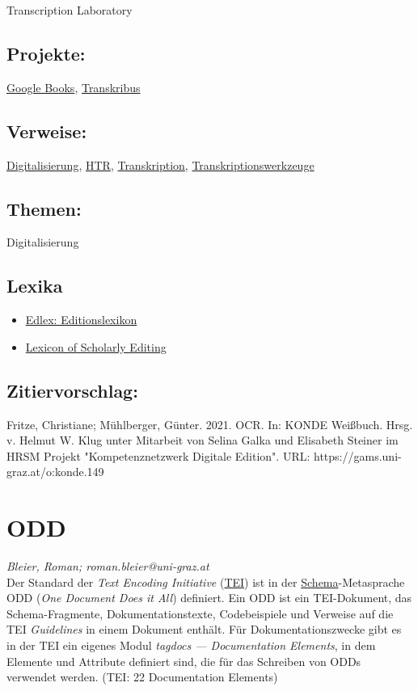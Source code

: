 \documentclass{article}
\begin{document}
{                           Transcription Laboratory}\subsection*{Projekte:}\href{https://books.google.at}{Google Books}, \href{https://readcoop.eu/transkribus/}{Transkribus}\subsection*{Verweise:}\href{https://gams.uni-graz.at/o:konde.60}{Digitalisierung}, \href{https://gams.uni-graz.at/o:konde.224}{HTR}, \href{https://gams.uni-graz.at/o:konde.197}{Transkription}, \href{https://gams.uni-graz.at/o:konde.199}{Transkriptionswerkzeuge}\subsection*{Themen:}Digitalisierung\subsection*{Lexika}\begin{itemize}\item \href{https://edlex.de/index.php?title=Optical_Character_Recognition_(OCR)}{Edlex: Editionslexikon}\item \href{https://lexiconse.uantwerpen.be/index.php/lexicon/ocr/}{Lexicon of Scholarly Editing}\end{itemize}\subsection*{Zitiervorschlag:}Fritze, Christiane; Mühlberger, Günter. 2021. OCR. In: KONDE Weißbuch. Hrsg. v. Helmut W. Klug unter Mitarbeit von Selina Galka und Elisabeth Steiner im HRSM Projekt "Kompetenznetzwerk Digitale Edition". URL: https://gams.uni-graz.at/o:konde.149\newpage\section*{ODD} \emph{Bleier, Roman; roman.bleier@uni-graz.at }\\
        
    Der Standard der \emph{Text Encoding Initiative} (\href{http://gams.uni-graz.at/o:konde.178}{TEI}) ist in der \href{http://gams.uni-graz.at/o:konde.166}{Schema}-Metasprache ODD (\emph{One Document Does it All}) definiert. Ein ODD ist ein
                  TEI-Dokument, das Schema-Fragmente, Dokumentationstexte, Codebeispiele und
                  Verweise auf die TEI \emph{Guidelines} in einem Dokument enthält.
                  Für Dokumentationszwecke gibt es in der TEI ein eigenes Modul \emph{tagdocs — Documentation Elements}, in dem Elemente und Attribute definiert
                  sind, die für das Schreiben von ODDs verwendet werden. (TEI: 22
                     Documentation Elements)\\
            
\end{document}
